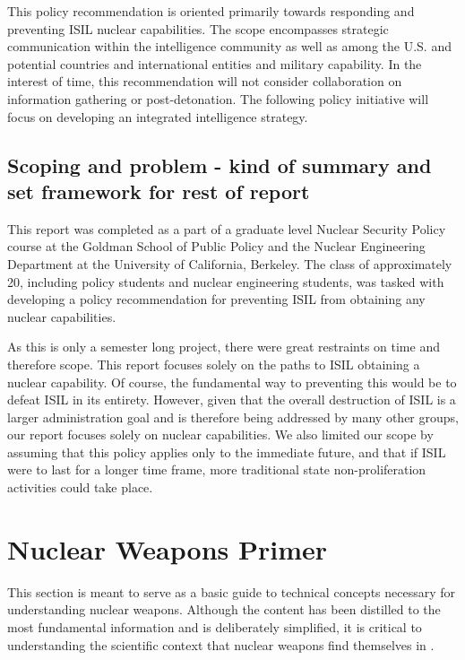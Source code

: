 \documentclass{report}
\begin{document}
This policy recommendation is oriented primarily towards responding and preventing ISIL nuclear capabilities. The scope encompasses strategic communication within the intelligence community as well as among the U.S. and potential countries and international entities and military capability. In the interest of time, this recommendation will not consider collaboration on information gathering or post-detonation. The following policy initiative will focus on developing an integrated intelligence strategy. 

\section{Scoping and problem - kind of summary and set framework for rest of report}

This report was completed as a part of a graduate level Nuclear Security Policy course at the Goldman School of Public Policy and the Nuclear Engineering Department at the University of California, Berkeley. The class of approximately 20, including policy students and nuclear engineering students, was tasked with developing a policy recommendation for preventing ISIL from obtaining any nuclear capabilities.

As this is only a semester long project, there were great restraints on time and therefore scope. This report focuses solely on the paths to ISIL obtaining a nuclear capability. Of course, the fundamental way to preventing this would be to defeat ISIL in its entirety. However, given that the overall destruction of ISIL is a larger administration goal and is therefore being addressed by many other groups, our report focuses solely on nuclear capabilities. We also limited our scope by assuming that this policy applies only to the immediate future, and that if ISIL were to last for a longer time frame, more traditional state non-proliferation activities could take place.









\chapter{Nuclear Weapons Primer}


This section is meant to serve as a basic guide to technical concepts necessary for understanding nuclear weapons. Although the content has been distilled to the most fundamental information and is deliberately simplified, it is critical to understanding the scientific context that nuclear weapons find themselves in \cite{Prussin2014}. 
\end{document}
